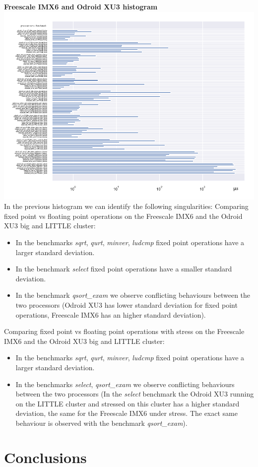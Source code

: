 \clearpage
\textbf{Freescale IMX6 and Odroid XU3 histogram}\newline
\hspace*{-3.2cm}
\includegraphics[width=570pt]{boards_histogram.pdf}
\clearpage
In the previous histogram we can identify the following singularities:
Comparing fixed point vs floating point operations on the Freescale IMX6 and the Odroid XU3 big and LITTLE cluster:
\begin{itemize}
		\item In the benchmarks \textit{sqrt}, \textit{qurt}, \textit{minver}, \textit{ludcmp} fixed point operations have a larger standard deviation.
		\item In the benchmark \textit{select} fixed point operations have a smaller standard deviation.
		\item In the benchmark \textit{qsort\_exam} we observe conflicting behaviours between the two processors (Odroid XU3 has lower standard deviation for fixed point operations, Freescale IMX6 has an higher standard deviation).
\end{itemize}
Comparing fixed point vs floating point operations with stress on the Freescale IMX6 and the Odroid XU3 big and LITTLE cluster:
\begin{itemize}
		\item In the benchmarks \textit{sqrt}, \textit{qurt}, \textit{minver}, \textit{ludcmp} fixed point operations have a larger standard deviation.
		\item In the benchmarks \textit{select}, \textit{qsort\_exam} we observe conflicting behaviours between the two processors (In the \textit{select} benchmark the Odroid XU3 running on the LITTLE cluster and stressed on this cluster has a higher standard deviation, the same for the Freescale IMX6 under stress. The exact same behaviour is observed with the benchmark \textit{qsort\_exam}).
\end{itemize}

\section{Conclusions}

